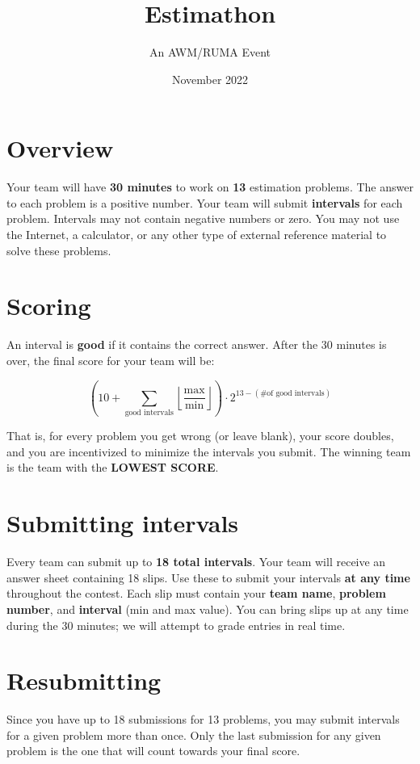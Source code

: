 \documentclass[12pt,letterpaper]{article}
\title{Estimathon}
\author{An AWM/RUMA Event}
\date{November 2022}
\begin{document}
\maketitle

\section*{Overview}

Your team will have \textbf{30 minutes} to work on \textbf{13} estimation problems. The answer to each problem is a positive number. Your team will submit \textbf{intervals} for each problem. Intervals may not contain negative numbers or zero. You may not use the Internet, a calculator, or any other type of external reference material to solve these problems.

\section*{Scoring}

An interval is \textbf{good} if it contains the correct answer. After the 30 minutes is over, the final score for your team will be:

\[\left(10+\sum_{\text{good intervals}}\left\lfloor\frac{\text{max}}{\text{min}}\right\rfloor\right)\cdot 2^{13-(\text{\# of good intervals})}\]

That is, for every problem you get wrong (or leave blank), your score doubles, and you are incentivized to minimize the intervals you submit. The winning team is the team with the \textbf{LOWEST SCORE}.

\section*{Submitting intervals}

Every team can submit up to \textbf{18 total intervals}. Your team will receive an answer sheet containing 18 slips. Use these to submit your intervals \textbf{at any time} throughout the contest. Each slip must contain your \textbf{team name}, \textbf{problem number}, and \textbf{interval} (min and max value). You can bring slips up at any time during the 30 minutes; we will attempt to grade entries in real time.

\section*{Resubmitting}

Since you have up to 18 submissions for 13 problems, you may submit intervals for a given problem more than once. Only the last submission for any given problem is the one that will count towards your final score.
\end{document}
